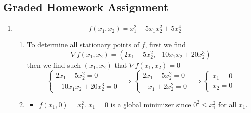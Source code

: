 \documentclass{article}
\begin{document}
\begin{tasks}
        \section*{Graded Homework Assignment}
        \begin{enumerate}[label={\color{tcum}P \Roman{week}.\arabic*}]
            \item \begin{displaymath}
                    f(x_1, x_2) = x_1^2 - 5x_1x_2^2 + 5x_2^4
                \end{displaymath}
                \begin{enumerate}
                    \item \label{roots} To determine all stationary points of \(f\), first
                        we find 
                        \begin{displaymath}
                            \nabla f(x_1, x_2) = (2x_1 - 5x_2^2, -10x_1x_2+20x_2^3)
                        \end{displaymath}
                        then we find such \((x_1, x_2)\) that \(\nabla f(x_1, x_2) = 0\)
                        \begin{displaymath}
                            \begin{cases}
                                2x_1 - 5x_2^2 = 0 \\
                                -10x_1x_2 + 20x_2^3 = 0
                            \end{cases}
                            \implies
                            \begin{cases}
                                2x_1 - 5x_2^2 = 0 \\
                                -x_1 + 2x_2^2 = 0
                            \end{cases}
                            \implies
                            \begin{cases}
                                x_1 = 0 \\
                                x_2 = 0
                            \end{cases}
                        \end{displaymath}
                    \item \begin{itemize}
                            \item \(f(x_1, 0) = x_1^2\). \(\bar{x}_1 = 0\) is a global minimizer
                                since \(0^2 \le x_1^2\) for all \(x_1\).

\end{itemize}
\end{enumerate}
\end{enumerate}
\end{tasks}
\end{document}
